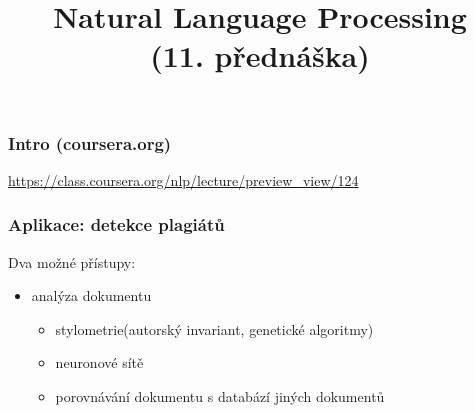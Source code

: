 \documentclass[red,professionalfont]{beamer}
\title[]{Natural Language Processing\\ (11. přednáška)}
\date[]{}
\theoremstyle{definition}
\newcommand{\0}{\mbox{${\bf 0}$}}
\begin{document}



\begin{frame}{} \titlepage
\end{frame}

\begin{frame}\frametitle{Intro (coursera.org)}

\begin{center}
\begin{block}{}
\url{https://class.coursera.org/nlp/lecture/preview_view/124}
\end{block}
\end{center}

\end{frame}

\begin{frame}\frametitle{Aplikace: detekce plagiátů}
Dva možné přístupy:\pause
\begin{itemize}
 \item analýza dokumentu\pause
 \begin{itemize}
 \item stylometrie\pause (autorský invariant\pause, genetické algoritmy)\pause
 \item neuronové sítě
  \item porovnávání dokumentu s databází jiných dokumentů
 \end{itemize}
\end{itemize}
\end{frame}
\end{document}

